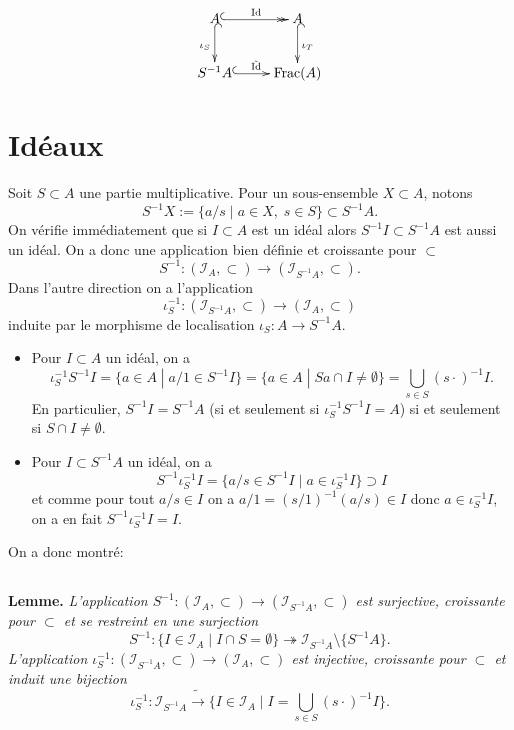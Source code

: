 \documentclass[a4paper, oneside, 12pt]{book}
\theoremstyle{definition} %
\begin{document}
	$$ \xymatrix{
		A \ar@{^{(}->>}[r]^{\mathrm{Id} } \ar@{^{(}->}[d]_{\iota_S} & A \ar@{^{(}->}[d]^{\iota_T} \\
		S^{-1}A \ar@{^{(}->}[r]^{\tilde{\mathrm{Id} } } & \mathrm{Frac}(A) }
	$$

\section{Idéaux}\label{LocIdeal} 

 Soit $S\subset A$ une partie multiplicative. Pour un sous-ensemble $X\subset A$, notons $$S^{-1}X:=\lbrace  a/s\;|\; a\in X,\; s\in S\rbrace \subset S^{-1}A. $$
On vérifie immédiatement que si $I\subset A$ est un idéal alors $S^{-1}I\subset S^{-1}A$ est aussi un idéal. On a donc une application bien définie et croissante pour $\subset$
$$S^{-1}:(\mathcal{I}_A,\subset)\rightarrow (\mathcal{I}_{S^{-1}A},\subset).$$
Dans l'autre direction on a l'application $$\iota_S^{-1}:(\mathcal{I}_{S^{-1}A},\subset)\rightarrow (\mathcal{I}_A,\subset)$$ induite  par le morphisme de localisation $\iota_S:A\rightarrow S^{-1}A$. 
\begin{itemize}[leftmargin=* ,parsep=0cm,itemsep=0cm,topsep=0cm] 
\item Pour $I\subset A$ un idéal, on a 
$$\iota_S^{-1}S^{-1}I=\lbrace a\in A\;|\; a/1\in S^{-1}I\rbrace= \lbrace a\in A\;|\;  Sa\cap I\not=\emptyset\rbrace=\bigcup_{s\in S}(s\cdot)^{-1}I.$$
En particulier, $S^{-1}I=S^{-1}A$ (si et seulement si $\iota_S^{-1}S^{-1}I=A$) si et seulement si $S\cap I\not=\emptyset$.\\
\item Pour $I\subset S^{-1}A$ un idéal, on a 
$$S^{-1}\iota_S^{-1}I=\lbrace a/s\in S^{-1}I\;|\; a\in \iota_S^{-1}I\rbrace\supset I$$
et comme  pour tout $a/s\in I$ on a $a/1= (s/1)^{-1}(a/s)\in I$ donc $a\in \iota_S^{-1}I$, on a en fait $S^{-1}\iota_S^{-1}I=I$.\\
 \end{itemize}
 
 On a donc montré: 
 
\subsection{}\label{LocIdeaux}\textbf{Lemme.} \textit{L'application $S^{-1}:(\mathcal{I}_A,\subset)\rightarrow (\mathcal{I}_{S^{-1}A},\subset) $ est surjective, croissante pour $\subset$ et se restreint en une surjection    $$S^{-1}:\lbrace I\in\mathcal{I}_A\;|\; I\cap S=\emptyset\rbrace \twoheadrightarrow  \mathcal{I}_{S^{-1}A}\setminus \lbrace S^{-1}A\rbrace . $$
L'application $\iota_S^{-1}:(\mathcal{I}_{S^{-1}A},\subset) \rightarrow  (\mathcal{I}_A,\subset)$ est injective,  croissante pour $\subset$  et induit une bijection  
$$\iota_S^{-1}:\mathcal{I}_{S^{-1}A} \tilde{\rightarrow} \lbrace I\in\mathcal{I}_A\;|\; I=\bigcup_{s\in S}(s\cdot)^{-1}I\rbrace .$$}
\end{document}
